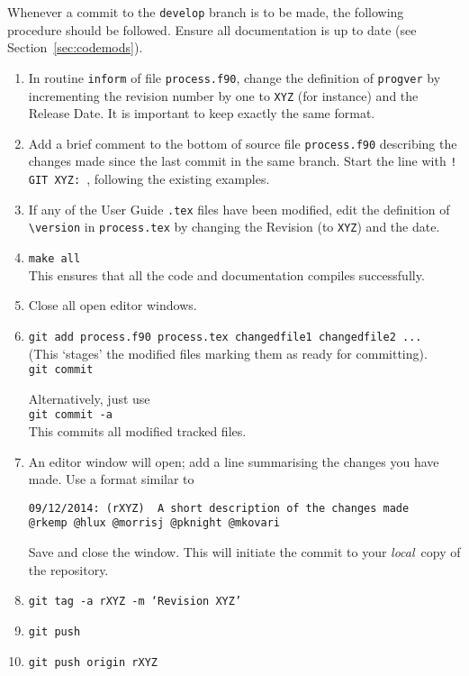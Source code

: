 Whenever a commit to the \texttt{develop} branch is to be made, the following
procedure should be followed. Ensure all documentation is up to date (see
Section~\ref{sec:codemods}).
\begin{enumerate}

\item In routine \texttt{inform} of file \texttt{process.f90}, change the
  definition of \texttt{progver} by incrementing the revision number by one to
  \texttt{XYZ} (for instance) and the Release Date. It is important to keep
  exactly the same format.

\item Add a brief comment to the bottom of source file \texttt{process.f90}
  describing the changes made since the last commit in the same branch. Start
  the line with \texttt{! GIT XYZ: }, following the existing examples.

\item If any of the User Guide \texttt{.tex} files have been modified, edit
  the definition of \verb+\version+ in \texttt{process.tex} by changing the
  Revision (to \texttt{XYZ}) and the date.
  
\item \texttt{make all} \\
This ensures that all the code and documentation compiles successfully.  

\item 
Close all open editor windows.

\item \texttt{git add process.f90 process.tex changedfile1 changedfile2 ...}  \\
  (This `stages' the modified files marking them as ready for committing).  \\
  \texttt{git commit}
  
  Alternatively, just use\\
  \texttt{git commit -a} \\
  This commits all modified tracked files.

\item An editor window will open; add a line summarising the changes you have made.  Use a format similar to
\begin{verbatim}
09/12/2014: (rXYZ)  A short description of the changes made
@rkemp @hlux @morrisj @pknight @mkovari
\end{verbatim}
Save and close the window. This will initiate the commit to your \textit{local}\ copy of the repository.  

\item \texttt{git tag -a rXYZ -m `Revision XYZ'}

\item \texttt{git push}

\item \texttt{git push origin rXYZ}

\end{enumerate}

